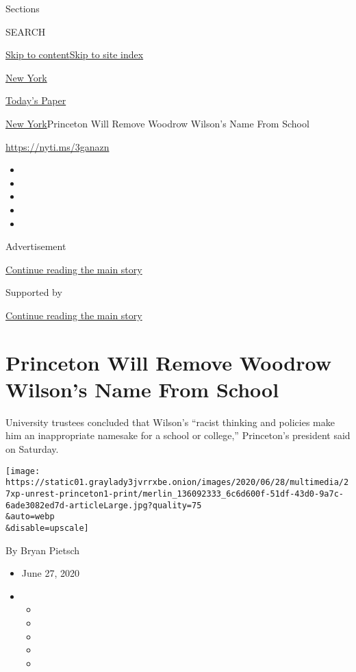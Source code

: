 Sections

SEARCH

\protect\hyperlink{site-content}{Skip to
content}\protect\hyperlink{site-index}{Skip to site index}

\href{https://www.nytimes3xbfgragh.onion/section/nyregion}{New York}

\href{https://myaccount.nytimes3xbfgragh.onion/auth/login?response_type=cookie\&client_id=vi}{}

\href{https://www.nytimes3xbfgragh.onion/section/todayspaper}{Today's
Paper}

\href{/section/nyregion}{New York}\textbar{}Princeton Will Remove
Woodrow Wilson's Name From School

\url{https://nyti.ms/3ganazn}

\begin{itemize}
\item
\item
\item
\item
\item
\end{itemize}

Advertisement

\protect\hyperlink{after-top}{Continue reading the main story}

Supported by

\protect\hyperlink{after-sponsor}{Continue reading the main story}

\hypertarget{princeton-will-remove-woodrow-wilsons-name-from-school}{%
\section{Princeton Will Remove Woodrow Wilson's Name From
School}\label{princeton-will-remove-woodrow-wilsons-name-from-school}}

University trustees concluded that Wilson's ``racist thinking and
policies make him an inappropriate namesake for a school or college,''
Princeton's president said on Saturday.

\texttt{[image: https://static01.graylady3jvrrxbe.onion/images/2020/06/28/multimedia/27xp-unrest-princeton1-print/merlin\_136092333\_6c6d600f-51df-43d0-9a7c-6ade3082ed7d-articleLarge.jpg?quality=75\\\&auto=webp\\\&disable=upscale]}

By Bryan Pietsch

\begin{itemize}
\item
  June 27, 2020
\item
  \begin{itemize}
  \item
  \item
  \item
  \item
  \item
  \end{itemize}
\end{itemize}

